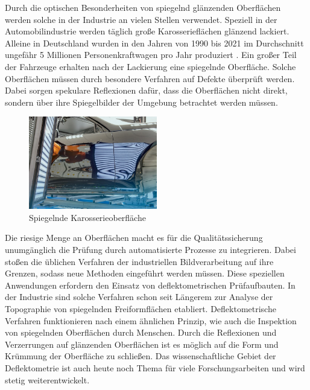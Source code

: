 Durch die optischen Besonderheiten von spiegelnd glänzenden Oberflächen werden solche in der Industrie an vielen Stellen verwendet.
Speziell in der Automobilindustrie werden täglich große Karosserieflächen glänzend lackiert.
Alleine in Deutschland wurden in den Jahren von 1990 bis 2021 im Durchschnitt ungefähr 5 Millionen Personenkraftwagen pro Jahr produziert \cite{statistaPKW}.
Ein großer Teil der Fahrzeuge erhalten nach der Lackierung eine spiegelnde Oberfläche.
Solche Oberflächen müssen durch besondere Verfahren auf Defekte überprüft werden.
Dabei sorgen spekulare Reflexionen dafür, dass die Oberflächen nicht direkt, sondern über ihre Spiegelbilder der Umgebung betrachtet werden müssen.

{
	\begin{figure}[H]
		\centering
		\includegraphics[width=0.5\textwidth]{01_einfuehrung/figures/spiegelndeKarosserie}
		\caption[Spiegelnde Karosserieoberfläche]{Spiegelnde Karosserieoberfläche \cite{spiegelndeKarosserieImg}}
		\label{img:spiegelndeKarosserie}
	\end{figure}
}

\noindent
Die riesige Menge an Oberflächen macht es für die Qualitätssicherung unumgänglich die Prüfung durch automatisierte Prozesse zu integrieren.
Dabei stoßen die üblichen Verfahren der industriellen Bildverarbeitung auf ihre Grenzen, sodass neue Methoden eingeführt werden müssen.
Diese speziellen Anwendungen erfordern den Einsatz von deflektometrischen Prüfaufbauten.
In der Industrie sind solche Verfahren schon seit Längerem zur Analyse der Topographie von spiegelnden Freiformflächen etabliert.
Deflektometrische Verfahren funktionieren nach einem ähnlichen Prinzip, wie auch die Inspektion von spiegelnden Oberflächen durch Menschen. 
Durch die Reflexionen und Verzerrungen auf glänzenden Oberflächen ist es möglich auf die Form und Krümmung der Oberfläche zu schließen.
Das wissenschaftliche Gebiet der Deflektometrie ist auch heute noch Thema für viele Forschungsarbeiten und wird stetig weiterentwickelt.

